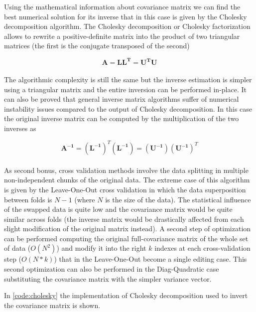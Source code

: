\documentclass{standalone}
\begin{document}
Using the mathematical information about covariance matrix we can find the best numerical solution for its inverse that in this case is given by the Cholesky decomposition algorithm.
The Cholesky decomposition or Cholesky factorization allows to rewrite a positive-definite matrix into the product of two triangular matrices (the first is the conjugate transposed of the second)

$$
\mathbf{A} = \mathbf{LL^T} = \mathbf{U^TU}
$$
\\
The algorithmic complexity is still the same but the inverse estimation is simpler using a triangular matrix and the entire inversion can be performed in-place.
It can also be proved that general inverse matrix algorithms suffer of numerical instability issues compared to the output of Cholesky decomposition.
In this case the original inverse matrix can be computed by the multiplication of the two inverses as

$$
\mathbf{A^{-1}} = (\mathbf{L^{-1}})^T(\mathbf{L^{-1}}) = (\mathbf{U^{-1}})(\mathbf{U^{-1}})^T
$$
\\
As second bonus, cross validation methods involve the data splitting in multiple non-independent chunks of the original data.
The extreme case of this algorithm is given by the Leave-One-Out cross validation in which the data superposition between folds is $N-1$ (where $N$ is the size of the data).
The statistical influence of the swapped data is quite low and the covariance matrix would be quite similar across folds (the inverse matrix would be drastically affected from each slight modification of the original matrix instead).
A second step of optimization can be performed computing the original full-covariance matrix of the whole set of data ($O(N^2)$) and modify it into the right $k$ indexes at each cross-validation step ($O(N*k)$) that in the Leave-One-Out become a single editing case.
This second optimization can also be performed in the Diag-Quadratic case substituting the covariance matrix with the simpler variance vector.

In \ref{code:cholesky} the implementation of Cholesky decomposition used to invert the covariance matrix is shown.
\end{document}
